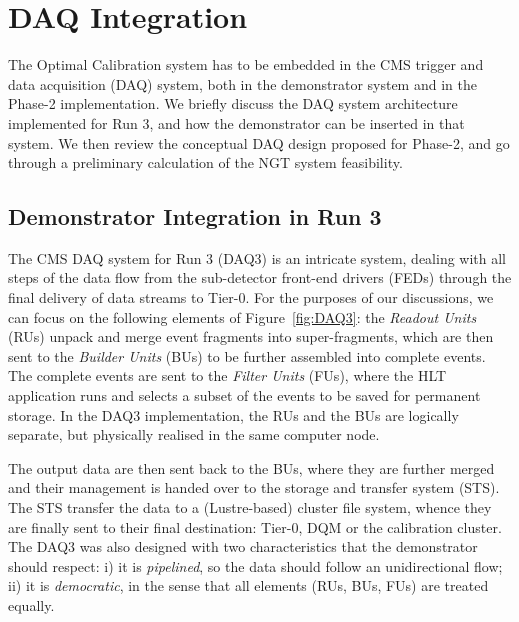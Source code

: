 \section{DAQ Integration} %


The Optimal Calibration system has to be embedded in the CMS trigger and data acquisition (DAQ) system,
both in the demonstrator system and in the Phase-2 implementation.
We briefly discuss the DAQ system architecture implemented for Run 3, 
and how the demonstrator can be inserted in that system.
We then review the conceptual DAQ design proposed for Phase-2, and 
go through a preliminary calculation of the NGT system feasibility.

\subsection{Demonstrator Integration in Run 3}

The CMS DAQ system for Run 3 (DAQ3) is an intricate system, dealing with all steps of the data flow from the sub-detector front-end drivers (FEDs) through the final delivery of data streams to Tier-0. For the purposes of our discussions, we can focus on the following elements of Figure~\ref{fig:DAQ3}: 
the \emph{Readout Units} (RUs) unpack and merge event fragments into super-fragments, which are then sent to the \emph{Builder Units} (BUs) to be further assembled into complete events. 
The complete events are sent to the \emph{Filter Units} (FUs), where the HLT application runs and selects a subset of the events to be saved for permanent storage. 
In the DAQ3 implementation, the RUs and the BUs are logically separate, but physically realised in the same computer node.

The output data are then sent back to the BUs, where they are further merged and their management is handed over to the storage and transfer system (STS).
The STS  transfer the data to a (Lustre-based) cluster file system, whence they are finally sent to their final destination:
Tier-0,
DQM
or the calibration cluster.
The DAQ3 was also designed with two characteristics that the demonstrator should respect: 
i) it is \emph{pipelined}, so the data should follow an unidirectional flow;
ii) it is \emph{democratic}, in the sense that all elements (RUs, BUs, FUs) are treated equally.

